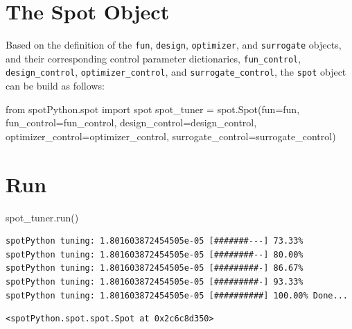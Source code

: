 \documentclass[
  letterpaper,
  DIV=11,
  numbers=noendperiod]{scrreprt}
\newenvironment{Shaded}{\begin{snugshade}}{\end{snugshade}}
\newcommand{\ImportTok}[1]{\textcolor[rgb]{0.00,0.46,0.62}{#1}}
\newcommand{\NormalTok}[1]{\textcolor[rgb]{0.00,0.23,0.31}{#1}}
\newcommand{\OperatorTok}[1]{\textcolor[rgb]{0.37,0.37,0.37}{#1}}
\begin{document}
\section{The Spot Object}\label{the-spot-object}

Based on the definition of the \texttt{fun}, \texttt{design},
\texttt{optimizer}, and \texttt{surrogate} objects, and their
corresponding control parameter dictionaries, \texttt{fun\_control},
\texttt{design\_control}, \texttt{optimizer\_control}, and
\texttt{surrogate\_control}, the \texttt{spot} object can be build as
follows:

\begin{Shaded}
\begin{Highlighting}[]
\ImportTok{from}\NormalTok{ spotPython.spot }\ImportTok{import}\NormalTok{ spot}
\NormalTok{spot\_tuner }\OperatorTok{=}\NormalTok{ spot.Spot(fun}\OperatorTok{=}\NormalTok{fun,}
\NormalTok{                       fun\_control}\OperatorTok{=}\NormalTok{fun\_control,}
\NormalTok{                       design\_control}\OperatorTok{=}\NormalTok{design\_control,}
\NormalTok{                       optimizer\_control}\OperatorTok{=}\NormalTok{optimizer\_control,}
\NormalTok{                       surrogate\_control}\OperatorTok{=}\NormalTok{surrogate\_control)}
\end{Highlighting}
\end{Shaded}

\section{Run}\label{run}

\begin{Shaded}
\begin{Highlighting}[]
\NormalTok{spot\_tuner.run()}
\end{Highlighting}
\end{Shaded}

\begin{verbatim}
spotPython tuning: 1.801603872454505e-05 [#######---] 73.33% 
spotPython tuning: 1.801603872454505e-05 [########--] 80.00% 
spotPython tuning: 1.801603872454505e-05 [#########-] 86.67% 
spotPython tuning: 1.801603872454505e-05 [#########-] 93.33% 
spotPython tuning: 1.801603872454505e-05 [##########] 100.00% Done...
\end{verbatim}

\begin{verbatim}
<spotPython.spot.spot.Spot at 0x2c6c8d350>
\end{verbatim}
\end{document}
